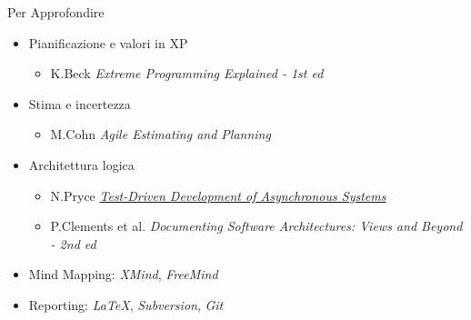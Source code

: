 \documentclass[compress, red, 14pt, pdf]{beamer}
\newcommand{\highlight}[1]{{\color{purple} \emph{#1}}}
\begin{document}
	\begin{frame}{Per Approfondire}
		\begin{itemize}	
			\item Pianificazione e valori in XP
				\begin{itemize}
					\item {\small K.Beck \highlight{Extreme Programming Explained - 1st ed}}
				\end{itemize}
			\item Stima e incertezza
				\begin{itemize}
					\item {\small M.Cohn \highlight{Agile Estimating and Planning}}
				\end{itemize}
			\item Architettura logica
				\begin{itemize}
					\item {\small N.Pryce \highlight{\href{http://www.natpryce.com/articles/000755.html}{Test-Driven Development of Asynchronous Systems}}}
					\item {\small P.Clements et al. \highlight{Documenting Software Architectures: Views and Beyond - 2nd ed}}
				\end{itemize}
		\end{itemize}
		
		\begin{itemize}
			\item Mind Mapping: \highlight{XMind}, \highlight{FreeMind}
			\item Reporting: \highlight{LaTeX}, \highlight{Subversion}, \highlight{Git}
		\end{itemize}
	\end{frame}
\end{document}
